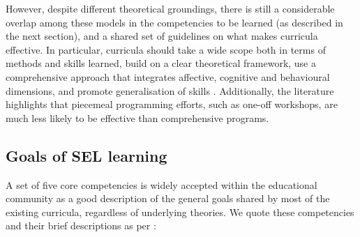 \documentclass[prodmode,acmtochi]{acmsmall}
\newcommand{\todolater}[1]{}
\begin{document}
However, despite different theoretical groundings, there is still a considerable overlap among these models in the competencies to be learned (as described in the next section), and a shared set of guidelines on what makes curricula effective. In particular, curricula should take a wide scope both in terms of methods and skills learned, build on a clear theoretical framework, use a comprehensive approach that integrates affective, cognitive and behavioural dimensions, and promote generalisation of skills \cite[p.119]{Elias1997}. Additionally, the literature highlights that piecemeal programming efforts, such as one-off workshops, are much less likely to be effective \cite[p.13]{Zins2004} than comprehensive programs.


\todolater{Outline the theoretical background of PATHS, Incredible Years and RULER. What does this mean for technology?}







\subsection{Goals of SEL learning}
\label{sec:blocks}



%

A set of five core competencies is widely accepted within the educational community \cite{Zins2007,Durlak2011,CASEL2003,CASEL2013} as a good description of the general goals shared by most of the existing curricula, regardless of underlying theories. We quote these competencies and their brief descriptions as per :
%
\end{document}

